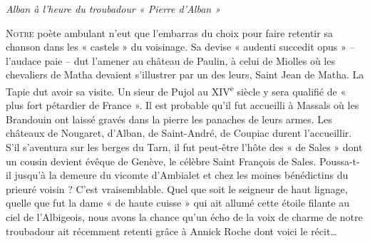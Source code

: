 \newpage

\begin{center}
    {\Large\itshape Alban à l'heure du troubadour « Pierre d'Alban »}
\end{center}

\vspace{1.2em}

\lettrine[lines=3,lhang=0.1,nindent=0em]{N}{otre} poète ambulant n'eut que l'embarras du choix pour faire retentir sa chanson dans les « castels » du voisinage. Sa devise « audenti succedit opus » -- l'audace paie -- dut l'amener au château de Paulin, à celui de Miolles où les chevaliers de Matha devaient s'illustrer par un des leurs, Saint Jean de Matha. La Tapie dut avoir sa visite. Un sieur de Pujol au XIV\textsuperscript{e} siècle y sera qualifié de « plus fort pétardier de France ». Il est probable qu'il fut accueilli à Massals où les Brandouin ont laissé gravés dans la pierre les panaches de leurs armes. Les châteaux de Nougaret, d'Alban, de Saint-André, de Coupiac durent l'accueillir. S'il s'aventura sur les berges du Tarn, il fut peut-être l'hôte des « de Sales » dont un cousin devient évêque de Genève, le célèbre Saint François de Sales. Poussa-t-il jusqu'à la demeure du vicomte d'Ambialet et chez les moines bénédictins du prieuré voisin ? C'est vraisemblable. Quel que soit le seigneur de haut lignage, quelle que fut la dame « de haute cuisse » qui ait allumé cette étoile filante au ciel de l'Albigeois, nous avons la chance qu'un écho de la voix de charme de notre troubadour ait récemment retenti grâce à Annick Roche dont voici le récit\ldots
